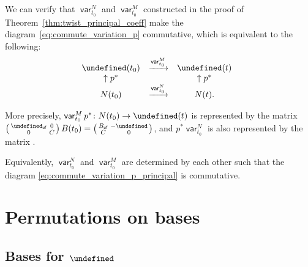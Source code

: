 \documentclass[10pt,a4paper]{amsart}
\newcommand{\opname}[1]{\operatorname{\mathsf{#1}}}
\newcommand{\var}{\opname{var}}
\newcommand{\ufv}{\opname{uf}}
\let\Mc\undefined
\let\upClAlg\undefined
\let\Id\undefined
\newcommand{\Mc}{M^\circ}
\newcommand{\upClAlg}{\mathcal{U}^A}
\newcommand{\Id}{{\opname{Id}}}
\numberwithin{equation}{section}
\begin{document}
\begin{Example}
We can verify that $\var_{t_{0}}^{N}$ and $\var_{t_{0}}^{M}$ constructed
in the proof of Theorem~\ref{thm:twist_principal_coeff} make the
diagram~\eqref{eq:commute_variation_p} commutative, which is equivalent
to the following:
\begin{align}
\begin{array}{@{}ccc}
\Mc(t_{0}) & \xrightarrow{\var_{t_{0}}^{M}} & \Mc(t)\\
\uparrow p^{*} & & \uparrow p^{*}\\
N(t_{0}) & \xrightarrow{\var_{t_{0}}^{N}} & N(t).
\end{array}\label{eq:commute_variation_p_principal}
\end{align}

More precisely, $\var_{t_{0}}^{M}p^{*}\colon N(t_{0})\rightarrow\Mc(t)$
is represented by the matrix $\left(\begin{smallmatrix}
\Id_{\ufv} & 0\\
0 & C
\end{smallmatrix}\right)B(t_{0})=\left(\begin{smallmatrix}
B_{\ufv} & -\Id\\
C & 0
\end{smallmatrix}\right)$, and $p^{*}\var_{t_{0}}^{N}$ is also represented by the matrix \smash{$B(t)\left(\begin{smallmatrix}
\Id_{\ufv} & 0\\
0 & G
\end{smallmatrix}\right)=\left(\begin{smallmatrix}
B_{\ufv} & -\Id\\
C & 0
\end{smallmatrix}\right)$}.

Equivalently, $\var_{t_{0}}^{N}$ and $\var_{t_{0}}^{M}$ are determined
by each other such that the diagram \eqref{eq:commute_variation_p_principal}
is commutative.
\end{Example}

\section{Permutations on bases}\label{sec:Permutation-on-bases}

\subsection[Bases for U\^{}A]{Bases for $\boldsymbol{\upClAlg}$}\label{sec:permute_A_bases}
\end{document}

